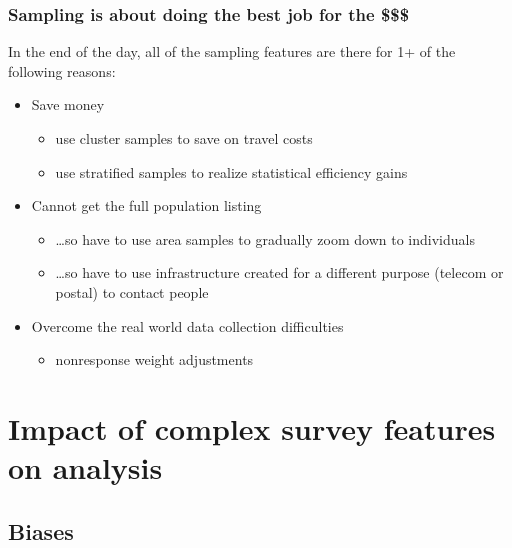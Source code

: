 \documentclass[aspectratio=43]{beamer}
\begin{document}
\begin{frame}\frametitle{Sampling is about doing the best job for the \$\$\$}

In the end of the day, all of the sampling features are there for 1+ of the following reasons:

\begin{itemize}
    \item Save money
        \begin{itemize}
            \item use cluster samples to save on travel costs
            \item use stratified samples to realize statistical efficiency gains
        \end{itemize}
    \item Cannot get the full population listing
        \begin{itemize}
            \item \ldots so have to use area samples to gradually zoom down to individuals
            \item \ldots so have to use infrastructure created for a different purpose (telecom or postal) to contact people
        \end{itemize}
    \item Overcome the real world data collection difficulties
        \begin{itemize}
            \item nonresponse weight adjustments
        \end{itemize}
\end{itemize}

\end{frame}

\section{Impact of complex survey features on analysis}

\subsection{Biases}
\end{document}
